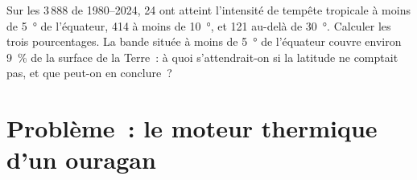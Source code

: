 \begin{exercise}[$\star\star\star$]\label{exo:g10:storms-and-cyclones:15}
Sur les 3\,888  de 1980--2024, 24 ont atteint
l'intensité de tempête tropicale à moins de \qty{5}{\degree} de l'équateur,
414 à moins de \qty{10}{\degree}, et 121 au-delà de \qty{30}{\degree}.
Calculer les trois pourcentages. La bande située à moins de
\qty{5}{\degree} de l'équateur couvre environ \qty{9}{\percent} de la
surface de la Terre~: à quoi s'attendrait-on si la latitude ne comptait
pas, et que peut-on en conclure~?
\end{exercise}

\section{Problème~: le moteur thermique d'un ouragan}

